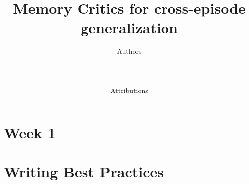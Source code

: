 \documentclass[a4paper, 11pt]{article}
\title{Memory Critics for cross-episode generalization}
\author{
  \small Authors\\
  \vspace{-.3em}
 \rule{.38\textwidth}{.7pt}\\
   \footnotesize Attributions
}
\date{\vspace{-.5em}}
\begin{document}
\begin{tcolorbox}[
colback=blue!60!gray!5, colframe=gray!50, 
boxrule=0pt, 
    arc=2mm%
]
\maketitle
\tcbline

  \vskip 0.5cm
  \makeatletter
  \tcbline \ifdefempty{\metadatalist}{}{\metadatalist\par}
  \makeatother
  
\end{tcolorbox}
\begin{abstract}
\end{abstract}



\tableofcontents
\newpage 



\section{Week 1}

\section{Writing Best Practices}




\newpage
\newpage


\newpage 

\newpage
\appendix
\end{document}
